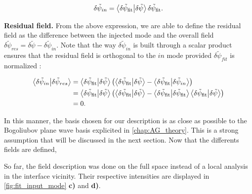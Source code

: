 \begin{equation}
    \delta \tilde{\psi}_{in} = \bra{\delta \tilde{\psi}_{\mathrm{fit}}}\ket{\delta \tilde{\psi}} \delta \tilde{\psi}_{\mathrm{fit}}. 
    \label{eq:input_mode_scalar_product}
\end{equation}

\bigskip 

\textbf{Residual field.} From the above expression, we are able to define the residual field as the difference between the injected mode and the overall field $\delta \tilde{\psi}_{res} = \delta \tilde{\psi}-\delta \tilde{\psi}_{in}$. 
Note that the way $\delta \tilde{\psi}_{in}$ is built through a scalar product ensures that the residual field is orthogonal to the $in$ mode provided $\delta \tilde{\psi}_{fit}$ is normalized :

\begin{equation}
    \begin{aligned}
    \bra{\delta \tilde{\psi}_{in}}\ket{\delta \tilde{\psi}_{res}} &=\bra{\delta \tilde{\psi}_{\mathrm{fit}}}\ket{\delta \tilde{\psi}} \left(\bra{\delta \tilde{\psi}_{\mathrm{fit}}}\ket{\delta \tilde{\psi}} - \bra{\delta \tilde{\psi}_{\mathrm{fit}}}\ket{\delta \tilde{\psi}_{in}}\right)\\
    &= \bra{\delta \tilde{\psi}_{\mathrm{fit}}}\ket{\delta \tilde{\psi}} \left(\bra{\delta \tilde{\psi}_{\mathrm{fit}}}\ket{\delta \tilde{\psi}}-\bra{\delta \tilde{\psi}_{\mathrm{fit}}}\ket{\delta \tilde{\psi}_{\mathrm{fit}}}\bra{\delta \tilde{\psi}_{\mathrm{fit}}}\ket{\delta \tilde{\psi}}\right)\\
    &=0.
    \end{aligned}
\end{equation}

In this manner, the basis chosen for our description is as close as possible to the Bogoliubov plane wave basis explicited in \autoref{chap:AG_theory}. This is a strong assumption 
that will be discussed in the next section. Now that the differents fields are defined, 

So far, the field description was done on the full space instead of a local analysis in the interface vicinity. Their respective intensities are displayed in \autoref{fig:fit_input_mode} \textbf{c)} and \textbf{d)}.

